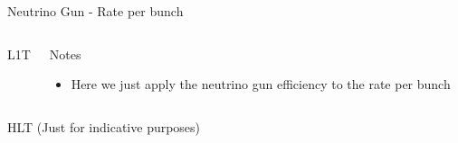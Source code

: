 \documentclass[8pt]{beamer}
\begin{document}
\begin{frame}{Neutrino Gun - Rate per bunch}

\begin{columns}

\begin{block}{L1T}
\centering

\resizebox{1.0\linewidth}{!}{

}

\end{block}

\begin{block}{Notes}
 
\begin{itemize}
  \item Here we just apply the neutrino gun efficiency to the rate per bunch
\end{itemize}
 
\end{block}

\end{columns}

\begin{block}{HLT (Just for indicative purposes)}
\centering
 
\resizebox{0.8\linewidth}{!}{  }

\end{block}

\end{frame}
\end{document}
